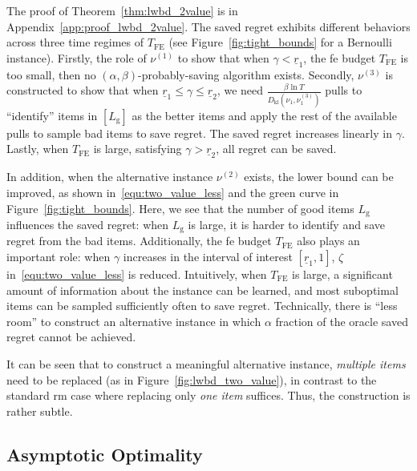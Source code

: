 \documentclass[twoside,11pt]{article}
\newcommand{\kl}{D_{\mathrm{kl}}}
\newcommand{\rmg}{\mathrm{g}}
\newcommand{\Tfe}{T_{\mathrm{FE}}}
\begin{document}
The proof of Theorem~\ref{thm:lwbd_2value} is in Appendix~\ref{app:proof_lwbd_2value}.
The saved regret exhibits different behaviors across three time regimes of $\Tfe$ (see Figure~\ref{fig:tight_bounds} for a Bernoulli instance). 
Firstly, the role of $\nu^{(1)}$ to show that when $\gamma <\underline{r}_1$, the \ac{fe} budget $\Tfe$ is too small, then no  $(\alpha,\beta)$-probably-saving algorithm  exists.
Secondly, $\nu^{(3)}$ is constructed to show that when $\underline{r}_1\leq \gamma \leq\underline{r}_2$, we need $\frac{\beta \ln T}{\kl(\nu_1,\nu_1^{(3)})}$ pulls to ``identify'' items in $[L_{\rmg}]$ as the better items and apply the rest of the available pulls to sample bad items to save regret. The saved regret increases linearly in $\gamma$.
Lastly, when $\Tfe$ is large, satisfying  $\gamma >\underline{r}_2$, all regret can be saved.

In addition, when the alternative instance $\nu^{(2)}$ exists, the lower bound can be improved, as shown in~\eqref{equ:two_value_less} and the green curve in Figure~\ref{fig:tight_bounds}. Here, we see that 
the number of good items $L_{\rmg}$ influences the saved regret: when $L_{\rmg}$ is large, it is harder to identify and save regret from the bad items.
Additionally, the \ac{fe} budget $\Tfe$ also plays an important role: when $\gamma$ increases in the interval of interest $[\underline{r}_1,1]$, $\zeta$ in~\eqref{equ:two_value_less} is  reduced. Intuitively, when $\Tfe$ is large, a significant amount of information about the instance can be learned, and most suboptimal items can be  sampled sufficiently often to save regret. Technically, there is ``less room'' to construct an alternative instance in which $\alpha$ fraction of the oracle saved regret cannot be achieved.

It can be seen that %
to construct a meaningful alternative instance, {\em multiple items} need to be replaced (as in Figure~\ref{fig:lwbd_two_value}), in contrast to the standard \ac{rm} case where replacing only {\em   one item} suffices. Thus, the construction is rather subtle.


\subsection{Asymptotic Optimality}\label{sec:tightness}
\end{document}
